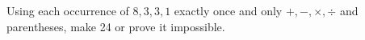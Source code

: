 Using each occurrence of $8,3,3,1$ exactly once and only $+,-,\times,\div$ and parentheses, make 24 or prove it impossible.

